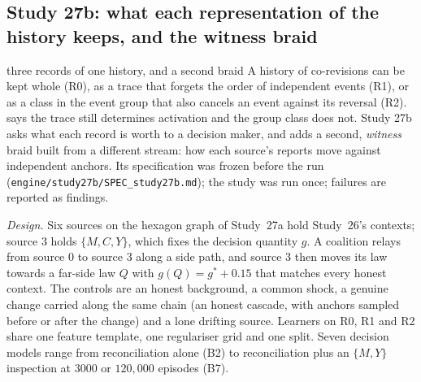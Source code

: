 \documentclass[11pt]{article}
\theoremstyle{definition}\newtheorem{definition}[theorem]{Definition}\newtheorem{remark}[theorem]{Remark}\newtheorem{example}[theorem]{Example}\newtheorem{problem}[theorem]{Open problem}\crefname{problem}{Problem}{Problems}
\begin{document}
\subsection{Study 27b: what each representation of the history keeps, and the witness braid}\label{sec:study27b}
\begin{readerbox}{three records of one history, and a second braid}
A history of co-revisions can be kept whole (R0), as a trace that forgets the order of independent events (R1), or as a class in the
event group that also cancels an event against its reversal (R2).  says the trace still determines activation and
the group class does not. Study 27b asks what each record is worth to a decision maker, and adds a second, \emph{witness} braid built
from a different stream: how each source's reports move against independent anchors. Its specification was frozen before the run
(\texttt{engine/study27b/SPEC\_study27b.md}); the study was run once; failures are reported as findings.
\end{readerbox}
\emph{Design.} Six sources on the hexagon graph of Study~27a hold Study~26's contexts; source $3$ holds $\{M,C,Y\}$, which fixes the decision quantity $g$. A coalition relays from source $0$ to source $3$ along a side path, and source $3$ then moves its law towards a far-side law $Q$ with $g(Q)=g^\ast+0.15$ that matches every honest context. The controls are an honest background, a common shock, a genuine change carried along the same chain (an honest cascade, with anchors sampled before or after the change) and a lone drifting source. Learners on R0, R1 and R2 share one feature template, one regulariser grid and one split. Seven decision models range from reconciliation alone (B2) to reconciliation plus an $\{M,Y\}$ inspection at $3000$ or $120{,}000$ episodes (B7).
\end{document}
